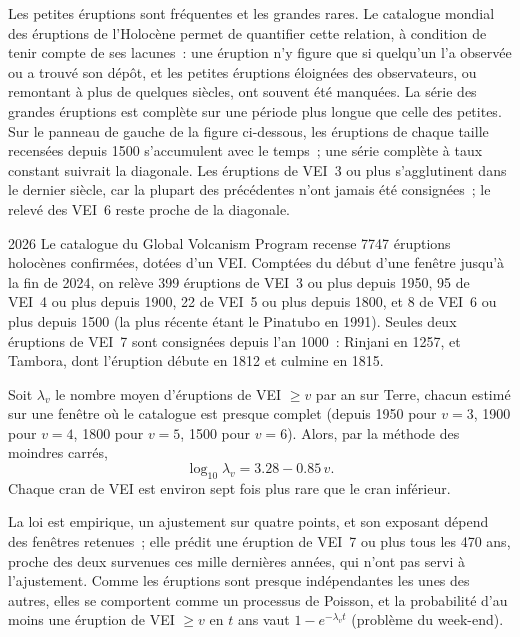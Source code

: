 Les petites éruptions sont fréquentes et les grandes rares. Le catalogue mondial des éruptions
de l'Holocène permet de quantifier cette relation, à condition de tenir compte de ses
lacunes~: une éruption n'y figure que si quelqu'un l'a observée ou a trouvé son dépôt,
et les petites éruptions éloignées des observateurs, ou remontant à plus de quelques siècles,
ont souvent été manquées. La série des grandes éruptions est complète sur une période
plus longue que celle des petites. Sur le panneau de gauche de la figure ci-dessous, les éruptions
de chaque taille recensées depuis 1500 s'accumulent avec le temps~; une série complète à taux
constant suivrait la diagonale. Les éruptions de VEI~3 ou plus s'agglutinent dans le dernier siècle,
car la plupart des précédentes n'ont jamais été consignées~; le relevé des VEI~6 reste
proche de la diagonale.

\begin{dated}{2026}
Le catalogue du Global Volcanism Program recense \num{7747} éruptions holocènes confirmées, dotées d'un VEI. Comptées du début
d'une fenêtre jusqu'à la fin de 2024, on relève 399 éruptions de VEI~3 ou plus depuis 1950, 95 de VEI~4 ou plus depuis 1900,
22 de VEI~5 ou plus depuis 1800, et 8 de VEI~6 ou plus depuis 1500 (la plus
récente étant le Pinatubo en 1991). Seules deux éruptions de VEI~7 sont consignées depuis
l'an 1000~: Rinjani en 1257, et Tambora,
dont l'éruption débute en 1812 et culmine en
1815.
\end{dated}

\begin{proposition}\label{prop:b2:eruptive-styles:frequency}
Soit $\lambda_v$ le nombre moyen d'éruptions de VEI $\ge v$ par an sur Terre,
chacun estimé sur une fenêtre où le catalogue est presque complet (depuis 1950
pour $v = 3$, 1900 pour $v = 4$, 1800 pour $v = 5$, 1500 pour $v = 6$). Alors, par la méthode
des moindres carrés,
\[
\log_{10}\lambda_v = 3.28 - 0.85\,v .
\]
Chaque cran de VEI est environ sept fois plus rare que le cran inférieur.
\end{proposition}

La loi est empirique, un ajustement sur quatre points, et son exposant dépend des
fenêtres retenues~; elle prédit une éruption de VEI~7 ou plus tous les \num{470} ans,
proche des deux survenues ces mille dernières années, qui n'ont pas servi à l'ajustement. Comme
les éruptions sont presque indépendantes les unes des autres, elles se comportent comme un processus de Poisson,
et la probabilité d'au moins une éruption de VEI $\ge v$ en $t$ ans
vaut $1 - e^{-\lambda_vt}$ (problème du week-end).

